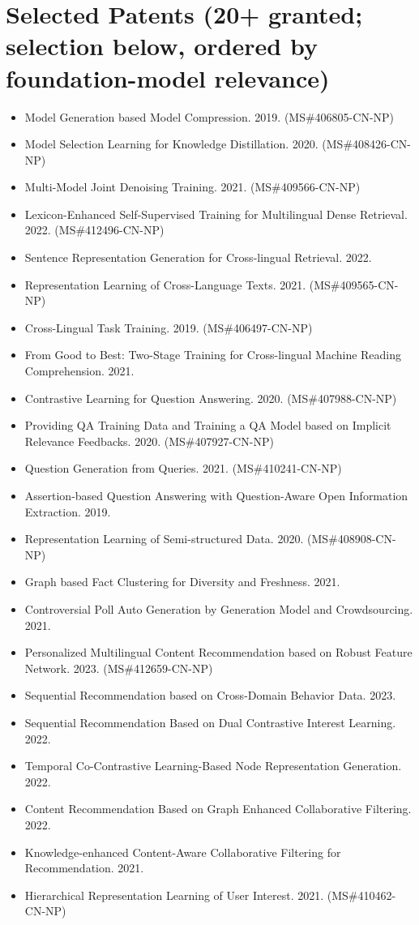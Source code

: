 \documentclass[10.5pt,letterpaper]{article}
\begin{document}
\section*{Selected Patents (20+ granted; selection below, ordered by foundation-model relevance)}
\begin{itemize}[leftmargin=1.1em, itemsep=0pt, topsep=1pt, parsep=0pt]
  \item Model Generation based Model Compression. 2019. (MS\#406805-CN-NP)
  \item Model Selection Learning for Knowledge Distillation. 2020. (MS\#408426-CN-NP)
  \item Multi-Model Joint Denoising Training. 2021. (MS\#409566-CN-NP)
  \item Lexicon-Enhanced Self-Supervised Training for Multilingual Dense Retrieval. 2022. (MS\#412496-CN-NP)
  \item Sentence Representation Generation for Cross-lingual Retrieval. 2022.
  \item Representation Learning of Cross-Language Texts. 2021. (MS\#409565-CN-NP)
  \item Cross-Lingual Task Training. 2019. (MS\#406497-CN-NP)
  \item From Good to Best: Two-Stage Training for Cross-lingual Machine Reading Comprehension. 2021.
  \item Contrastive Learning for Question Answering. 2020. (MS\#407988-CN-NP)
  \item Providing QA Training Data and Training a QA Model based on Implicit Relevance Feedbacks. 2020. (MS\#407927-CN-NP)
  \item Question Generation from Queries. 2021. (MS\#410241-CN-NP)
  \item Assertion-based Question Answering with Question-Aware Open Information Extraction. 2019.
  \item Representation Learning of Semi-structured Data. 2020. (MS\#408908-CN-NP)
  \item Graph based Fact Clustering for Diversity and Freshness. 2021.
  \item Controversial Poll Auto Generation by Generation Model and Crowdsourcing. 2021.
  \item Personalized Multilingual Content Recommendation based on Robust Feature Network. 2023. (MS\#412659-CN-NP)
  \item Sequential Recommendation based on Cross-Domain Behavior Data. 2023.
  \item Sequential Recommendation Based on Dual Contrastive Interest Learning. 2022.
  \item Temporal Co-Contrastive Learning-Based Node Representation Generation. 2022.
  \item Content Recommendation Based on Graph Enhanced Collaborative Filtering. 2022.
  \item Knowledge-enhanced Content-Aware Collaborative Filtering for Recommendation. 2021.
  \item Hierarchical Representation Learning of User Interest. 2021. (MS\#410462-CN-NP)
\end{itemize}
\end{document}
